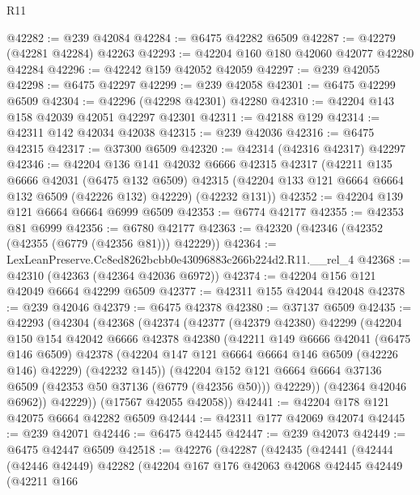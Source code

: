 \begin{lexlean}{R11}
\begin{coremodule}
@42282 := @239 @42084
@42284 := @6475 @42282 @6509
@42287 := @42279 (@42281 @42284) @42263
@42293 := @42204 @160 @180 @42060 @42077 @42280 @42284
@42296 := @42242 @159 @42052 @42059
@42297 := @239 @42055
@42298 := @6475 @42297
@42299 := @239 @42058
@42301 := @6475 @42299 @6509
@42304 := @42296 (@42298 @42301) @42280
@42310 := @42204 @143 @158 @42039 @42051 @42297 @42301
@42311 := @42188 @129
@42314 := @42311 @142 @42034 @42038
@42315 := @239 @42036
@42316 := @6475 @42315
@42317 := @37300 @6509
@42320 := @42314 (@42316 @42317) @42297
@42346 := @42204
    @136
    @141
    @42032
    @6666
    @42315
    @42317
    (@42211
      @135
      @6666
      @42031
      (@6475 @132 @6509)
      @42315
      (@42204 @133 @121 @6664 @6664 @132 @6509 (@42226 @132) @42229)
      (@42232 @131))
@42352 := @42204 @139 @121 @6664 @6664 @6999 @6509
@42353 := @6774 @42177
@42355 := @42353 @81 @6999
@42356 := @6780 @42177
@42363 := @42320 (@42346 (@42352 (@42355 (@6779 (@42356 @81))) @42229))
@42364 := LexLeanPreserve.Cc8ed8262bcbb0e43096883c266b224d2.R11.__rel_4
@42368 := @42310 (@42363 (@42364 @42036 @6972))
@42374 := @42204 @156 @121 @42049 @6664 @42299 @6509
@42377 := @42311 @155 @42044 @42048
@42378 := @239 @42046
@42379 := @6475 @42378
@42380 := @37137 @6509
@42435 := @42293
    (@42304
      (@42368
        (@42374
          (@42377
            (@42379 @42380)
            @42299
            (@42204
              @150
              @154
              @42042
              @6666
              @42378
              @42380
              (@42211
                @149
                @6666
                @42041
                (@6475 @146 @6509)
                @42378
                (@42204 @147 @121 @6664 @6664 @146 @6509 (@42226 @146) @42229)
                (@42232 @145))
              (@42204
                @152
                @121
                @6664
                @6664
                @37136
                @6509
                (@42353 @50 @37136 (@6779 (@42356 @50)))
                @42229))
            (@42364 @42046 @6962))
          @42229))
      (@17567 @42055 @42058))
@42441 := @42204 @178 @121 @42075 @6664 @42282 @6509
@42444 := @42311 @177 @42069 @42074
@42445 := @239 @42071
@42446 := @6475 @42445
@42447 := @239 @42073
@42449 := @6475 @42447 @6509
@42518 := @42276
    (@42287
      (@42435
        (@42441
          (@42444
            (@42446 @42449)
            @42282
            (@42204
              @167
              @176
              @42063
              @42068
              @42445
              @42449
              (@42211
                @166

\end{coremodule}
\end{lexlean}
